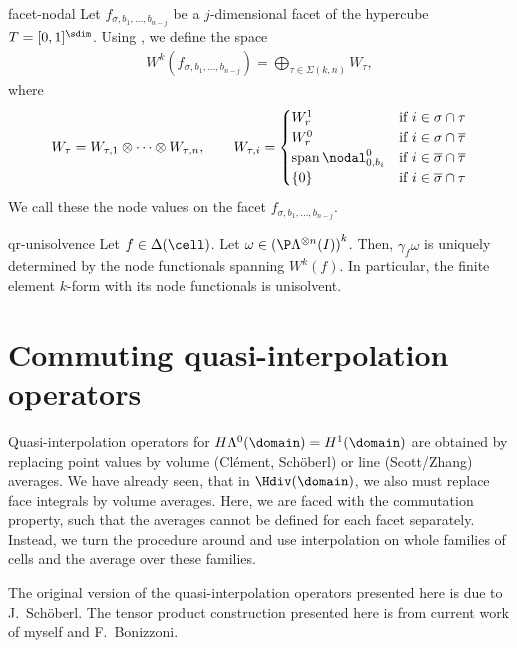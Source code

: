 \begin{Definition}{facet-nodal}
  Let $f_{\sigma,b_1,\dots,b_{n-j}}$ be a $j$-dimensional facet of the
  hypercube $T = [0,1]^\sdim$. Using ,
  we define the space
  \begin{gather}
    W^k(f_{\sigma,b_1,\dots,b_{n-j}}) = \bigoplus_{\tau\in\Sigma(k,n)} W_\tau,
  \end{gather}
  where
  \begin{gather}
    W_\tau = W_{\tau,1}\otimes \dots \otimes W_{\tau,n},
    \qquad W_{\tau,i} =
    \begin{cases}
      W_r^1 & \text{if } i \in \sigma \cap \tau\\
      W_r^0 & \text{if } i \in \sigma \cap \overline\tau\\
      \operatorname{span} \nodal_{0,b_i}^0 & \text{if } i \in \overline\sigma \cap \overline\tau\\
      \{0\} & \text{if } i \in \overline\sigma \cap \tau
    \end{cases}
  \end{gather}
  We call these the node values on the facet $f_{\sigma,b_1,\dots,b_{n-j}}$.
\end{Definition}

\begin{Theorem}{qr-unisolvence}
  Let $f\in\Delta(\cell)$. Let
  $\omega\in \left(\P\Lambda^{\otimes n}(I)\right)^k$. Then,
  $\gamma_f\omega$ is uniquely determined by the node functionals
  spanning $W^k(f)$. In particular, the finite element $k$-form with
  its node functionals is unisolvent.
\end{Theorem}

\section{Commuting quasi-interpolation operators}

\begin{intro}
  Quasi-interpolation operators for
  $H\Lambda^0(\domain) = H^1(\domain)$ are obtained by replacing point
  values by volume (Clément, Schöberl) or line (Scott/Zhang)
  averages. We have already seen, that in $\Hdiv(\domain)$, we also
  must replace face integrals by volume averages. Here, we are faced
  with the commutation property, such that the averages cannot be
  defined for each facet separately. Instead, we turn the procedure
  around and use interpolation on whole families of cells and the
  average over these families.
  
  The original version of the quasi-interpolation operators presented
  here is due to J.~Schöberl. The tensor product construction
  presented here is from current work of myself and F.~Bonizzoni.
\end{intro}


